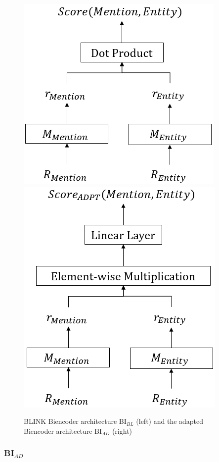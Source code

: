 \documentclass{report}
\theoremstyle{definition}
\theoremstyle{remark}
\begin{document}
\begin{figure}[H]
    \centering
    \includegraphics[scale=0.65]{BiencoderB.png}
    \hspace{1.5cm}
    \includegraphics[scale=0.65]{BiencoderADPT.png}
    \caption{BLINK Biencoder architecture BI$_{BL}$ (left) and the adapted Biencoder architecture BI$_{AD}$ (right)}
    \label{fig:biencoderB}
\end{figure}

\subsubsection{BI$_{AD}$}
\label{sec:biencoderadaptexplanation}
\end{document}
